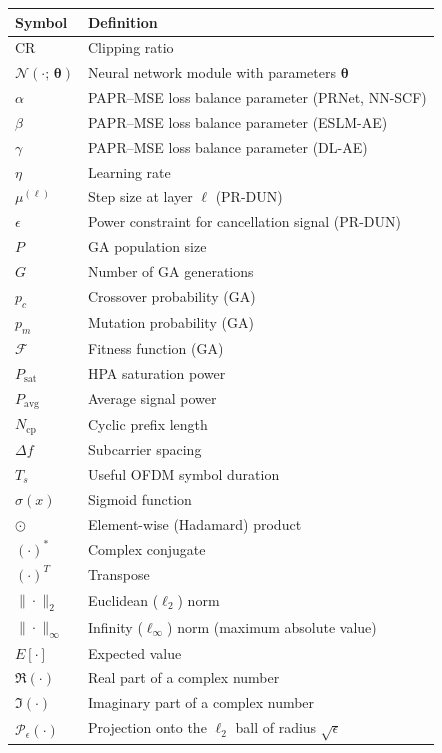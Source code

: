 \begin{center}
\vspace{1cm}
\begin{tabular}{l l}
\toprule
    \textbf{Symbol} & \textbf{Definition} \\
\midrule
$\mathrm{CR}$ & Clipping ratio \\
$\mathcal{N}(\cdot;\,\bm{\theta})$ & Neural network module with parameters $\bm{\theta}$ \\
$\alpha$ & PAPR--MSE loss balance parameter (PRNet, NN-SCF) \\
$\beta$ & PAPR--MSE loss balance parameter (ESLM-AE) \\
$\gamma$ & PAPR--MSE loss balance parameter (DL-AE) \\
$\eta$ & Learning rate \\
$\mu^{(\ell)}$ & Step size at layer $\ell$ (PR-DUN) \\
$\epsilon$ & Power constraint for cancellation signal (PR-DUN) \\
$P$ & GA population size \\
$G$ & Number of GA generations \\
$p_c$ & Crossover probability (GA) \\
$p_m$ & Mutation probability (GA) \\
$\mathcal{F}$ & Fitness function (GA) \\
$P_{\mathrm{sat}}$ & HPA saturation power \\
$P_{\mathrm{avg}}$ & Average signal power \\
$N_{\mathrm{cp}}$ & Cyclic prefix length \\
$\Delta f$ & Subcarrier spacing \\
$T_s$ & Useful OFDM symbol duration \\
$\sigma(x)$ & Sigmoid function \\
$\odot$ & Element-wise (Hadamard) product \\
$(\cdot)^*$ & Complex conjugate \\
$(\cdot)^T$ & Transpose \\
$\|\cdot\|_2$ & Euclidean ($\ell_2$) norm \\
$\|\cdot\|_\infty$ & Infinity ($\ell_\infty$) norm (maximum absolute value) \\
$E[\cdot]$ & Expected value \\
$\Re(\cdot)$ & Real part of a complex number \\
$\Im(\cdot)$ & Imaginary part of a complex number \\
$\mathcal{P}_\epsilon(\cdot)$ & Projection onto the $\ell_2$ ball of radius $\sqrt{\epsilon}$ \\
\bottomrule
\end{tabular}
\end{center}
